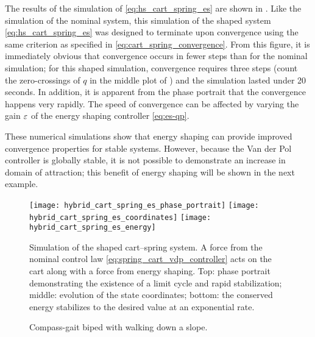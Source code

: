 The results of the simulation of \eqref{eq:hs_cart_spring_es} are shown in
.
%
Like the simulation of the nominal system, this simulation of the shaped system
\eqref{eq:hs_cart_spring_es} was designed to terminate upon convergence using
the same criterion as specified in \eqref{eq:cart_spring_convergence}.
%
From this figure, it is immediately obvious that convergence occurs in fewer
steps than for the nominal simulation;
%
for this shaped simulation, convergence requires three steps (count the
zero-crossings of $q$ in the middle plot of
) and the simulation lasted under 20
seconds.
%
In addition, it is apparent from the phase portrait that the convergence happens
very rapidly.
%
The speed of convergence can be affected by varying the gain $\varepsilon$ of
the energy shaping controller \eqref{eq:es-qp}.

These numerical simulations show that energy shaping can provide improved
convergence properties for stable systems.
%
However, because the Van der Pol controller is globally stable, it is not
possible to demonstrate an increase in domain of attraction;
%
this benefit of energy shaping will be shown in the next example.


\begin{figure*}[htp!]
  \centering
  \texttt{[image: hybrid\_cart\_spring\_es\_phase\_portrait]}
  \texttt{[image: hybrid\_cart\_spring\_es\_coordinates]}
  \texttt{[image: hybrid\_cart\_spring\_es\_energy]}
  \caption[Simulation of the shaped cart--spring system.]{Simulation of the
    shaped cart--spring system.
    A force from the nominal control law \eqref{eq:spring_cart_vdp_controller}
    acts on the cart along with a force from energy shaping.
    Top: phase portrait demonstrating the existence of a limit cycle and rapid
    stabilization;
    middle: evolution of the state coordinates;
    bottom: the conserved energy stabilizes to the desired value at an
    exponential rate.}
  \label{fig:cart_spring_simulation_shaped}
\end{figure*}


\begin{figure}
  \centering
  \def\svgwidth{0.5\columnwidth}
  
  \caption{Compass-gait biped with walking down a slope.}
  \label{fig:simulation-model}
  \vspace{-1em}
\end{figure}

